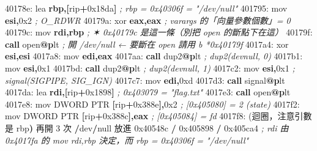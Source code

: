 \documentclass[10pt,a4paper]{article}
\newenvironment{Shaded}{\begin{snugshade}}{\end{snugshade}}
\newcommand{\BaseNTok}[1]{\textcolor[rgb]{0.00,0.00,0.81}{#1}}
\newcommand{\BuiltInTok}[1]{#1}
\newcommand{\CommentTok}[1]{\textcolor[rgb]{0.56,0.35,0.01}{\textit{#1}}}
\newcommand{\ControlFlowTok}[1]{\textcolor[rgb]{0.13,0.29,0.53}{\textbf{#1}}}
\newcommand{\DataTypeTok}[1]{\textcolor[rgb]{0.13,0.29,0.53}{#1}}
\newcommand{\DecValTok}[1]{\textcolor[rgb]{0.00,0.00,0.81}{#1}}
\newcommand{\ErrorTok}[1]{\textcolor[rgb]{0.64,0.00,0.00}{\textbf{#1}}}
\newcommand{\FunctionTok}[1]{\textcolor[rgb]{0.13,0.29,0.53}{\textbf{#1}}}
\newcommand{\KeywordTok}[1]{\textcolor[rgb]{0.13,0.29,0.53}{\textbf{#1}}}
\newcommand{\NormalTok}[1]{#1}
\newcommand{\OperatorTok}[1]{\textcolor[rgb]{0.81,0.36,0.00}{\textbf{#1}}}
\renewenvironment{Shaded}{%
  \def\FrameCommand{\fboxsep=3.2pt\colorbox{shadecolor}}%
  \MakeFramed{\advance\hsize-\width\FrameRestore\small}%
}{%
  \endMakeFramed
}
\begin{document}
\begin{Shaded}
\begin{Highlighting}[]
\NormalTok{40178e:  }\BuiltInTok{lea}  \KeywordTok{rbp}\OperatorTok{,[}\NormalTok{rip}\OperatorTok{+}\BaseNTok{0x18da}\OperatorTok{]}        \CommentTok{; rbp = 0x40306f = "/dev/null"}
\NormalTok{401795:  }\BuiltInTok{mov}  \KeywordTok{esi}\OperatorTok{,}\BaseNTok{0x2}                 \CommentTok{; O\_RDWR}
\NormalTok{40179a:  }\BuiltInTok{xor}  \KeywordTok{eax}\OperatorTok{,}\KeywordTok{eax}                 \CommentTok{; varargs 的「向量參數個數」= 0}
\NormalTok{40179c:  }\BuiltInTok{mov}  \KeywordTok{rdi}\OperatorTok{,}\KeywordTok{rbp}                 \CommentTok{; ✶ 0x40179c 是這一條（別把 open 的斷點下在這）}
\NormalTok{40179f:  }\ControlFlowTok{call}\NormalTok{ open}\FunctionTok{@}\ErrorTok{p}\NormalTok{lt                }\CommentTok{; 開 /dev/null  ← 要斷在 open 請用 \textasciigrave{}b *0x40179f\textasciigrave{}}
\NormalTok{4017a4:  }\BuiltInTok{xor}  \KeywordTok{esi}\OperatorTok{,}\KeywordTok{esi}
\NormalTok{4017a8:  }\BuiltInTok{mov}  \KeywordTok{edi}\OperatorTok{,}\KeywordTok{eax}
\NormalTok{4017aa:  }\ControlFlowTok{call}\NormalTok{ dup2}\FunctionTok{@}\ErrorTok{p}\NormalTok{lt                }\CommentTok{; dup2(devnull, 0)}
\NormalTok{4017b1:  }\BuiltInTok{mov}  \KeywordTok{esi}\OperatorTok{,}\BaseNTok{0x1}
\NormalTok{4017bd:  }\ControlFlowTok{call}\NormalTok{ dup2}\FunctionTok{@}\ErrorTok{p}\NormalTok{lt                }\CommentTok{; dup2(devnull, 1)}
\NormalTok{4017c2:  }\BuiltInTok{mov}  \KeywordTok{esi}\OperatorTok{,}\BaseNTok{0x1}                 \CommentTok{; signal(SIGPIPE, SIG\_IGN)}
\NormalTok{4017c7:  }\BuiltInTok{mov}  \KeywordTok{edi}\OperatorTok{,}\BaseNTok{0xd}
\NormalTok{4017d3:  }\ControlFlowTok{call}\NormalTok{ signal}\FunctionTok{@}\ErrorTok{p}\NormalTok{lt}
\NormalTok{4017da:  }\BuiltInTok{lea}  \KeywordTok{rdi}\OperatorTok{,[}\NormalTok{rip}\OperatorTok{+}\BaseNTok{0x1898}\OperatorTok{]}        \CommentTok{; 0x403079 = "flag.txt"}
\NormalTok{4017e3:  }\ControlFlowTok{call}\NormalTok{ open}\FunctionTok{@}\ErrorTok{p}\NormalTok{lt}
\NormalTok{4017e8:  }\BuiltInTok{mov}  \DataTypeTok{DWORD} \DataTypeTok{PTR} \OperatorTok{[}\NormalTok{rip}\OperatorTok{+}\BaseNTok{0x388e}\OperatorTok{],}\BaseNTok{0x2}      \CommentTok{; [0x405080] = 2   (state)}
\NormalTok{4017f2:  }\BuiltInTok{mov}  \DataTypeTok{DWORD} \DataTypeTok{PTR} \OperatorTok{[}\NormalTok{rip}\OperatorTok{+}\BaseNTok{0x388c}\OperatorTok{],}\KeywordTok{eax}      \CommentTok{; [0x405084] = fd}
\NormalTok{4017f8:  (迴圈，注意引數是 rbp}\OperatorTok{)}\NormalTok{  再開 }\DecValTok{3}\NormalTok{ 次 }\OperatorTok{/}\NormalTok{dev}\OperatorTok{/}\NormalTok{null 放進 }\BaseNTok{0x40548c} \OperatorTok{/} \BaseNTok{0x405898} \OperatorTok{/} \BaseNTok{0x405ca4}
                                  \CommentTok{; rdi 由 0x4017fa 的 \textasciigrave{}mov rdi,rbp\textasciigrave{} 決定，而 rbp = 0x40306f = "/dev/null"}
\end{Highlighting}
\end{Shaded}
\end{document}
